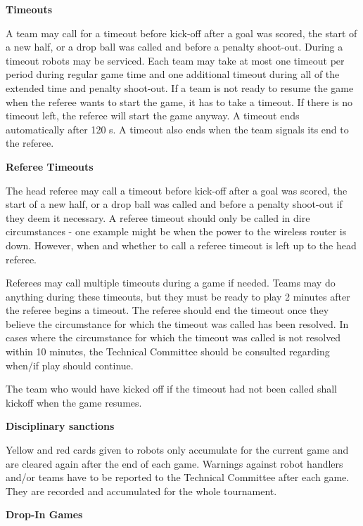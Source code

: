 \bigskip

{\bfseries Timeouts}

A team may call for a timeout before kick-off after a goal was scored,
the start of a new half, or a drop ball was called and before a penalty shoot-out.
During a timeout robots may be serviced.
Each team may take at most one timeout per period during regular game time and
one additional timeout during all of the extended time and penalty shoot-out.
If a team is not ready to resume the game when the referee wants to start the game,
it has to take a timeout.
If there is no timeout left, the referee will start the game anyway.
A timeout ends automatically after 120 s.
A timeout also ends when the team signals its end to the referee.

\bigskip

{\bfseries Referee Timeouts}

The head referee may call a timeout before kick-off after a goal was scored,
the start of a new half, or a drop ball was called and before a penalty
shoot-out if they deem it necessary.
A referee timeout should only be called in dire circumstances -
one example might be when the power to the wireless router is down.
However, when and whether to call a referee timeout is left up to the head referee.

Referees may call multiple timeouts during a game if needed. Teams may do anything during these timeouts, but they must be ready to play 2 minutes after the referee begins a timeout. The referee should end the timeout once they believe the circumstance for which the timeout was called has been resolved. In cases where the circumstance for which the timeout was called is not resolved within 10 minutes, the Technical Committee should be consulted regarding when/if play should continue.

The team who would have kicked off if the timeout had not been called shall kickoff when the game resumes.

\bigskip

{\bfseries Disciplinary sanctions}

Yellow and red cards given to robots only accumulate for the current game and are cleared again after the end of each game. Warnings against robot handlers and/or teams have to be reported to the Technical Committee after each game. They are recorded and accumulated for the whole tournament. 




\bigskip

{\bfseries Drop-In Games}

